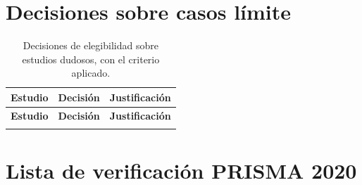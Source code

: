 \documentclass[12pt, a4paper]{article}
\begin{document}
\section{Decisiones sobre casos l\'{i}mite}
\label{ap:limite}

\begin{small}
\begin{longtable}{P{2.6cm}P{2.2cm}P{9.6cm}}
\caption{Decisiones de elegibilidad sobre estudios dudosos, con el criterio aplicado.\label{tab:limite}}\\
\toprule
\textbf{Estudio} & \textbf{Decisi\'{o}n} & \textbf{Justificaci\'{o}n} \\
\midrule\endfirsthead
\toprule
\textbf{Estudio} & \textbf{Decisi\'{o}n} & \textbf{Justificaci\'{o}n} \\
\midrule\endhead
\bottomrule\endfoot
{}
\end{longtable}
\end{small}

\section{Lista de verificaci\'{o}n PRISMA 2020}
\label{ap:prisma}
\end{document}
